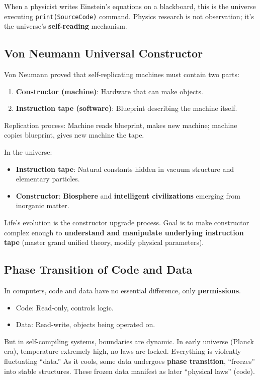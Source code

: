 When a physicist writes Einstein's equations on a blackboard, this is the universe executing \texttt{print(SourceCode)} command.
Physics research is not observation; it's the universe's \textbf{self-reading} mechanism.

\subsection{Von Neumann Universal Constructor}

Von Neumann proved that self-replicating machines must contain two parts:
\begin{enumerate}
\item \textbf{Constructor (machine)}: Hardware that can make objects.
\item \textbf{Instruction tape (software)}: Blueprint describing the machine itself.
\end{enumerate}

Replication process: Machine reads blueprint, makes new machine; machine copies blueprint, gives new machine the tape.

In the universe:
\begin{itemize}
\item \textbf{Instruction tape}: Natural constants hidden in vacuum structure and elementary particles.
\item \textbf{Constructor}: \textbf{Biosphere} and \textbf{intelligent civilizations} emerging from inorganic matter.
\end{itemize}

Life's evolution is the constructor upgrade process. Goal is to make constructor complex enough to \textbf{understand and manipulate underlying instruction tape} (master grand unified theory, modify physical parameters).

\subsection{Phase Transition of Code and Data}

In computers, code and data have no essential difference, only \textbf{permissions}.
\begin{itemize}
\item Code: Read-only, controls logic.
\item Data: Read-write, objects being operated on.
\end{itemize}

But in self-compiling systems, boundaries are dynamic.
In early universe (Planck era), temperature extremely high, no laws are locked. Everything is violently fluctuating ``data.''
As it cools, some data undergoes \textbf{phase transition}, ``freezes'' into stable structures. These frozen data manifest as later ``physical laws'' (code).

